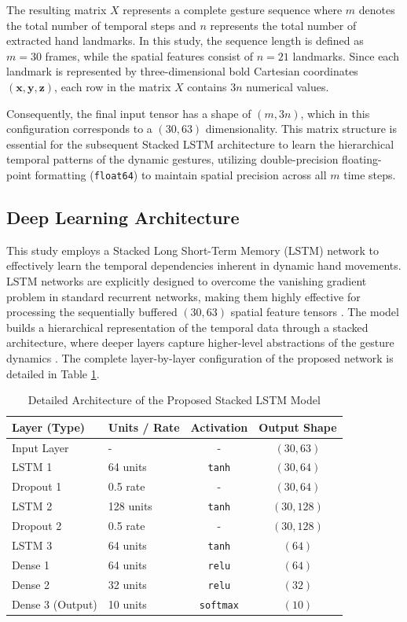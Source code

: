 The resulting matrix $X$ represents a complete gesture sequence where $m$ denotes the total number of temporal steps and $n$ represents the total number of extracted hand landmarks. In this study, the sequence length is defined as $m = 30$ frames, while the spatial features consist of $n = 21$ landmarks. Since each landmark is represented by three-dimensional bold Cartesian coordinates $(\mathbf{x}, \mathbf{y}, \mathbf{z})$, each row in the matrix $X$ contains $3n$ numerical values. 

Consequently, the final input tensor has a shape of $(m, 3n)$, which in this configuration corresponds to a $(30, 63)$ dimensionality. This matrix structure is essential for the subsequent Stacked LSTM architecture to learn the hierarchical temporal patterns of the dynamic gestures, utilizing double-precision floating-point formatting (\texttt{float64}) to maintain spatial precision across all $m$ time steps.


\subsection{Deep Learning Architecture}

This study employs a Stacked Long Short-Term Memory (LSTM) network to effectively learn the temporal dependencies inherent in dynamic hand movements. LSTM networks are explicitly designed to overcome the vanishing gradient problem in standard recurrent networks, making them highly effective for processing the sequentially buffered $(30, 63)$ spatial feature tensors \cite{sengupta2020review}. The model builds a hierarchical representation of the temporal data through a stacked architecture, where deeper layers capture higher-level abstractions of the gesture dynamics \cite{yu2019review}. The complete layer-by-layer configuration of the proposed network is detailed in Table \ref{tab:model_architecture}.

\begin{table}[htbp]
\caption{Detailed Architecture of the Proposed Stacked LSTM Model}
\label{tab:model_architecture}
\centering
\begin{tabular}{l l c c}
\hline
\hline
\textbf{Layer (Type)} & \textbf{Units / Rate} & \textbf{Activation} & \textbf{Output Shape} \\ 
\hline
Input Layer & - & - & $(30, 63)$ \\
LSTM 1 & 64 units & \texttt{tanh} & $(30, 64)$ \\
Dropout 1 & 0.5 rate & - & $(30, 64)$ \\
LSTM 2 & 128 units & \texttt{tanh} & $(30, 128)$ \\
Dropout 2 & 0.5 rate & - & $(30, 128)$ \\
LSTM 3 & 64 units & \texttt{tanh} & $(64)$ \\
Dense 1 & 64 units & \texttt{relu} & $(64)$ \\
Dense 2 & 32 units & \texttt{relu} & $(32)$ \\
Dense 3 (Output) & 10 units & \texttt{softmax} & $(10)$ \\
\hline
\end{tabular}
\end{table}

